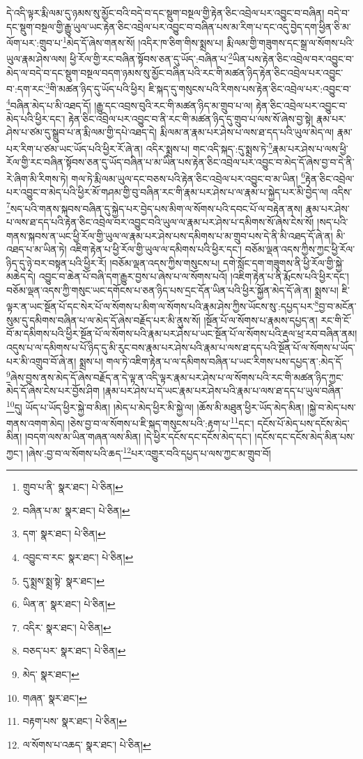 དེ་འདི་ལྟར་རྨི་ལམ་དུ་ཉམས་སུ་མྱོང་བའི་བདེ་བ་དང་སྡུག་བསྔལ་གྱི་རྟེན་ཅིང་འབྲེལ་པར་འབྱུང་བ་བཞིན། བདེ་བ་དང་སྡུག་བསྔལ་གྱི་རྒྱུ་ཡུལ་ཡང་རྟེན་ཅིང་འབྲེལ་པར་འབྱུང་བ་བཞིན་པས་མ་རིག་པ་དང་འདུ་བྱེད་དག་ཕྱིན་ཅི་མ་ལོག་པར་:གྲུབ་པ་\footnote{གྲུབ་པ་ནི་  སྣར་ཐང་།  པེ་ཅིན། }མེད་དོ་ཞེས་གནས་སོ། །འདིར་ཁ་ཅིག་གིས་སྨྲས་པ། རྨི་ལམ་གྱི་གཟུགས་དང་སྒྲ་ལ་སོགས་པའི་ཡུལ་རྣམ་ཤེས་ལས། ཕྱི་རོལ་གྱི་རང་བཞིན་སྟོབས་ཅན་དུ་ཡོད་:བཞིན་པ་\footnote{བཞིན་པ་མ་  སྣར་ཐང་།  པེ་ཅིན། }ཡིན་པས་རྟེན་ཅིང་འབྲེལ་བར་འབྱུང་བ་མེད་ལ་བདེ་བ་དང་སྡུག་བསྔལ་བདག་ཉམས་སུ་མྱོང་བཞིན་པའི་རང་གི་མཚན་ཉིད་རྟེན་ཅིང་འབྲེལ་པར་འབྱུང་བ་:དག་རང་\footnote{དག་  སྣར་ཐང་།  པེ་ཅིན། }གི་མཚན་ཉིད་དུ་ཡོད་པའི་ཕྱིར། ཇི་སྐད་དུ་གསུངས་པའི་རིགས་པས་རྟེན་ཅིང་འབྲེལ་པར་:འབྱུང་བ་\footnote{འབྱུང་བ་རང་  སྣར་ཐང་།  པེ་ཅིན། }བཞིན་མེད་པ་མི་འཐད་དོ། །རྒྱུ་དང་འབྲས་བུའི་རང་གི་མཚན་ཉིད་མ་གྲུབ་པ་ལ། རྟེན་ཅིང་འབྲེལ་པར་འབྱུང་བ་མེད་པའི་ཕྱིར་དང་། རྟེན་ཅིང་འབྲེལ་པར་འབྱུང་བ་ནི་རང་གི་མཚན་ཉིད་དུ་གྲུབ་པ་ལས་སོ་ཞེས་བྱ་སྟེ། རྣམ་པར་ཤེས་པ་ཙམ་དུ་སྒྲུབ་པ་ན་རྨི་ལམ་གྱི་དཔེ་འཐད་དེ། རྨི་ལམ་ན་རྣམ་པར་ཤེས་པ་ལས་ཐ་དད་པའི་ཡུལ་མེད་ལ། རྣམ་པར་རིག་པ་ཙམ་ཡང་ཡོད་པའི་ཕྱིར་རོ་ཞེ་ན། འདིར་སྨྲས་པ། གང་འདི་སྐད་:དུ་སྨྲས་ཏེ་\footnote{དུ་སྨྲས་སྨྲ་སྟེ་  སྣར་ཐང་། }རྣམ་པར་ཤེས་པ་ལས་ཕྱི་རོལ་གྱི་རང་བཞིན་སྟོབས་ཅན་དུ་ཡོད་བཞིན་པ་མ་ཡིན་པས་རྟེན་ཅིང་འབྲེལ་པར་འབྱུང་བ་མེད་དོ་ཞེས་བྱ་བ་དེ་ནི་རེ་ཞིག་མི་རིགས་ཏེ། གལ་ཏེ་རྨི་ལམ་ཡུལ་དང་བཅས་པའི་རྟེན་ཅིང་འབྲེལ་པར་འབྱུང་བ་མ་ཡིན། \footnote{ཡིན་ན་  སྣར་ཐང་།  པེ་ཅིན། }རྟེན་ཅིང་འབྲེལ་པར་འབྱུང་བ་མེད་པའི་ཕྱིར་མོ་གཤམ་གྱི་བུ་བཞིན་རང་གི་རྣམ་པར་ཤེས་པ་ལ་རྣམ་པ་སྐྱེད་པར་མི་བྱེད་ལ། འདིས་\footnote{འདིར་  སྣར་ཐང་།  པེ་ཅིན། }སད་པའི་གནས་སྐབས་བཞིན་དུ་སྐྱེད་པར་བྱེད་པས་མིག་ལ་སོགས་པའི་དབང་པོ་ལ་བརྟེན་ནས། རྣམ་པར་ཤེས་པ་ལས་ཐ་དད་པའི་རྟེན་ཅིང་འབྲེལ་བར་འབྱུང་བའི་ཡུལ་ལ་རྣམ་པར་ཤེས་པ་དམིགས་སོ་ཞེས་ངེས་སོ། །སད་པའི་གནས་སྐབས་ན་ཡང་ཕྱི་རོལ་གྱི་ཡུལ་ལ་རྣམ་པར་ཤེས་པས་དམིགས་པ་མ་གྲུབ་པས་དེ་ནི་མི་འཐད་དོ་ཞེ་ན། མི་འཐད་པ་མ་ཡིན་ཏེ། འཇིག་རྟེན་པ་ཕྱི་རོལ་གྱི་ཡུལ་ལ་དམིགས་པའི་ཕྱིར་དང་། བཅོམ་ལྡན་འདས་ཀྱིས་ཀྱང་ཕྱི་རོལ་ཉིད་དུ་ཉེ་བར་བསྟན་པའི་ཕྱིར་རོ། །བཅོམ་ལྡན་འདས་ཀྱིས་གསུངས་པ། དགེ་སློང་དག་གཟུགས་ནི་ཕྱི་རོལ་གྱི་སྐྱེ་མཆེད་དེ། འབྱུང་བ་ཆེན་པོ་བཞི་དག་རྒྱུར་བྱས་པ་ཞེས་པ་ལ་སོགས་པའོ། །འཇིག་རྟེན་པ་ནི་རྨོངས་པའི་ཕྱིར་དང་། བཅོམ་ལྡན་འདས་ཀྱི་གསུང་ཡང་དགོངས་པ་ཅན་ཉིད་པས་དྲང་དོན་ཡིན་པའི་ཕྱིར་སྐྱོན་མེད་དོ་ཞེ་ན། སྨྲས་པ། ཇི་ལྟར་ན་ཡང་སྔོན་པོ་དང་སེར་པོ་ལ་སོགས་པ་མིག་ལ་སོགས་པའི་རྣམ་ཤེས་ཀྱིས་ཡོངས་སུ་:དཔྱད་པར་\footnote{བཅད་པར་  སྣར་ཐང་།  པེ་ཅིན། }བྱ་བ་མངོན་སུམ་དུ་དམིགས་བཞིན་པ་ལ་མེད་དོ་ཞེས་བརྗོད་པར་མི་ནུས་སོ། །སྔོན་པོ་ལ་སོགས་པ་རྣམས་དཔྱད་ན། རང་གི་ངོ་བོ་མ་དམིགས་པའི་ཕྱིར་སྔོན་པོ་ལ་སོགས་པའི་རྣམ་པར་ཤེས་པ་ཡང་སྔོན་པོ་ལ་སོགས་པའི་རྡུལ་ཕྲ་རབ་བཞིན་ནམ། འདུས་པ་ལ་དམིགས་པ་པོ་ཉིད་དུ་མི་རུང་བས་རྣམ་པར་ཤེས་པའི་རྣམ་པ་ལས་ཐ་དད་པའི་སྔོན་པོ་ལ་སོགས་པ་ཡོད་པར་མི་འགྲུབ་བོ་ཞེ་ན། སྨྲས་པ། གལ་ཏེ་འཇིག་རྟེན་པ་ལ་དམིགས་བཞིན་པ་ཡང་རིགས་པས་དཔྱད་ན་:མེད་དོ་\footnote{མེད་  སྣར་ཐང་། }ཞེས་བྱས་ནས་མེད་དོ་ཞེས་བརྗོད་ན་དེ་ལྟ་ན་འདི་ལྟར་རྣམ་པར་ཤེས་པ་ལ་སོགས་པའི་རང་གི་མཚན་ཉིད་ཀྱང་མེད་དོ་ཞེས་ངེས་པར་བྱོས་ཤིག །རྣམ་པར་ཤེས་པ་དེ་ཡང་རྣམ་པར་ཤེས་པའི་རྣམ་པ་ལས་ཐ་དད་པ་ཡུལ་བཞིན་\footnote{གཞན་  སྣར་ཐང་། }དུ། ཡོད་པ་ཡོད་ཕྱིར་སྐྱེ་བ་མིན། །མེད་པ་མེད་ཕྱིར་མི་སྐྱེ་ལ། །ཆོས་མི་མཐུན་ཕྱིར་ཡོད་མེད་མིན། །སྐྱེ་བ་མེད་པས་གནས་འགག་མེད། །ཅེས་བྱ་བ་ལ་སོགས་པ་ཇི་སྐད་གསུངས་པའི་:རྟག་པ་\footnote{བརྟག་པས་  སྣར་ཐང་།  པེ་ཅིན། }དང་། དངོས་པོ་མེད་པས་དངོས་མེད་མིན། །བདག་ལས་མ་ཡིན་གཞན་ལས་མིན། །དེ་ཕྱིར་དངོས་དང་དངོས་མེད་དང་། །དངོས་དང་དངོས་མེད་མིན་པས་ཀྱང་། །ཞེས་:བྱ་བ་ལ་སོགས་པའི་ཆད་\footnote{ལ་སོགས་པ་འཆད་  སྣར་ཐང་།  པེ་ཅིན། }པར་འགྱུར་བའི་དཔྱད་པ་ལས་ཀྱང་མ་གྲུབ་བོ། 